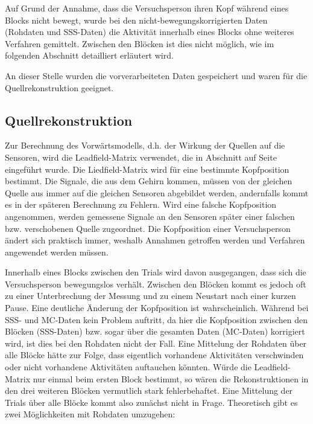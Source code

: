 \documentclass[doc,a4paper,12pt]{apa6}
\makeatletter
\DeclareRobustCommand*{\nameref}[1]{%
      \glqq{\myorg@nameref{#1}}\grqq%
    }%
\makeatother
\begin{document}
Auf Grund der Annahme, dass die Versuchsperson ihren Kopf während eines Blocks nicht bewegt, wurde bei den nicht-bewegungskorrigierten Daten (Rohdaten und SSS-Daten) die Aktivität innerhalb eines Blocks ohne weiteres Verfahren gemittelt. Zwischen den Blöcken ist dies nicht möglich, wie im folgenden Abschnitt detailliert erläutert wird.

An dieser Stelle wurden die vorverarbeiteten Daten gespeichert und waren für die Quellrekonstruktion geeignet.

\subsection{Quellrekonstruktion}
\label{sec:lead-beam-mne}

Zur Berechnung des Vorwärtsmodells, d.h. der Wirkung der Quellen auf die Sensoren, wird die Leadfield-Matrix verwendet, die in Abschnitt \nameref{sec:lead} auf Seite \pageref{sec:lead} eingeführt wurde. Die Liedfield-Matrix wird für eine bestimmte Kopfposition bestimmt. Die Signale, die aus dem Gehirn kommen, müssen von der gleichen Quelle aus immer auf die gleichen Sensoren abgebildet werden, andernfalls kommt es in der späteren Berechnung zu Fehlern. Wird eine falsche Kopfposition angenommen, werden gemessene Signale an den Sensoren später einer falschen bzw. verschobenen Quelle zugeordnet. Die Kopfposition einer Versuchsperson ändert sich praktisch immer, weshalb Annahmen getroffen werden und Verfahren angewendet werden müssen.

Innerhalb eines Blocks zwischen den Trials wird davon ausgegangen, dass sich die Versuchsperson bewegungslos verhält. Zwischen den Blöcken kommt es jedoch oft zu einer Unterbrechung der Messung und zu einem Neustart nach einer kurzen Pause. Eine deutliche Änderung der Kopfposition ist wahrscheinlich. Während bei SSS- und MC-Daten kein Problem auftritt, da hier die Kopfposition zwischen den Blöcken (SSS-Daten) bzw. sogar über die gesamten Daten (MC-Daten) korrigiert wird, ist dies bei den Rohdaten nicht der Fall. Eine Mittelung der Rohdaten über alle Blöcke hätte zur Folge, dass eigentlich vorhandene Aktivitäten verschwinden oder nicht vorhandene Aktivitäten auftauchen könnten. Würde die Leadfield-Matrix nur einmal beim ersten Block bestimmt, so wären die Rekonstruktionen in den drei weiteren Blöcken vermutlich stark fehlerbehaftet. Eine Mittelung der Trials über alle Blöcke kommt also zunächst nicht in Frage. Theoretisch gibt es zwei Möglichkeiten mit Rohdaten umzugehen:
\end{document}
